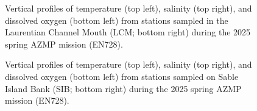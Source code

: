 \documentclass[12pt]{article}\usepackage[]{graphicx}\usepackage[]{color}
\begin{document}
\begin{appendices}
\begin{figure}[htb]
{}

\caption{Vertical profiles of temperature (top left), salinity (top right), and dissolved oxygen (bottom left) from stations sampled in the Laurentian Channel Mouth (LCM; bottom right) during the 2025 spring AZMP mission (EN728).}\label{fig:figureA10}
\end{figure}
\clearpage
\begin{figure}[htb]

{\centering {} 

}

\caption{Vertical profiles of temperature (top left), salinity (top right), and dissolved oxygen (bottom left) from stations sampled on Sable Island Bank (SIB; bottom right) during the 2025 spring AZMP mission (EN728).}\label{fig:figureA11}
\end{figure}
\clearpage

\end{appendices}
\end{document}
